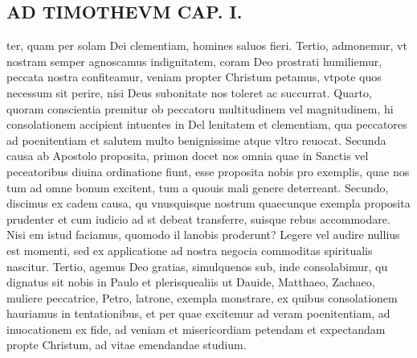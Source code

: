 \documentclass{article}
\begin{document}
\begin{pages}
\section*{AD TIMOTHEVM CAP. I. }
\marginpar{[ p.57 ]}\pstart ter, quam per solam Dei clementiam, homines saluos fieri. Tertio, admonemur, vt nostram semper agnoscamus indignitatem, coram Deo prostrati humiliemur, peccata nostra confiteamur, veniam propter Christum petamus, vtpote quos necessum sit perire, nisi Deus subonitate nos toleret ac succurrat. Quarto, quoram conscientia premitur ob peccatoru multitudinem vel magnitudinem, hi consolationem accipient intuentes in Del lenitatem et clementiam, qua peccatores ad poenitentiam et salutem multo benignissime atque  vltro reuocat. Secunda causa ab Apostolo proposita, primon docet nos omnia quae in Sanctis vel peceatoribus diuina ordinatione fiunt, esse proposita nobis pro exemplis, quae nos tum ad omne bonum excitent, tum a quouis mali genere deterreant. Secundo, discimus ex cadem causa, qu vnusquisque  nostrum quaecunque  exempla proposita prudenter et cum iudicio ad st debeat transferre, suisque  rebus accommodare. Nisi em istud faciamus, quomodo il lanobis proderunt? Legere vel audire nullius est momenti, sed ex applicatione ad nostra negocia commoditas spiritualis nascitur. Tertio, agemus Deo gratias, simulquenos sub, inde consolabimur, qu dignatus sit nobis in Paulo et plerisquealiis ut Dauide, Matthaeo, Zachaeo, muliere peccatrice, Petro, latrone, exempla monstrare, ex quibus consolationem hauriamus in tentationibus, et per quae excitemur ad veram poenitentiam, ad inuocationem ex fide, ad veniam et misericordiam petendam et expectandam propte Christum, ad vitae emendandae studium.  \pend
{}
{}

\end{pages}
\end{document}
